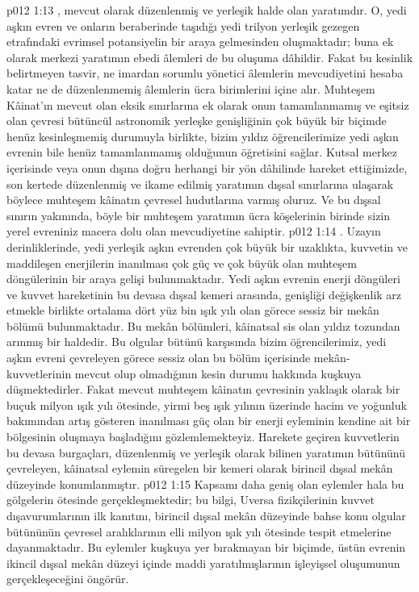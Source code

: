\vs p012 1:13 , mevcut olarak düzenlenmiş ve yerleşik halde olan yaratımdır. O, yedi aşkın evren ve onların beraberinde taşıdığı yedi trilyon yerleşik gezegen etrafındaki evrimsel potansiyelin bir araya gelmesinden oluşmaktadır; buna ek olarak merkezi yaratımın ebedi âlemleri de bu oluşuma dâhildir. Fakat bu kesinlik belirtmeyen tasvir, ne imardan sorumlu yönetici âlemlerin mevcudiyetini hesaba katar ne de düzenlenmemiş âlemlerin ücra birimlerini içine alır. Muhteşem Kâinat’ın mevcut olan eksik sınırlarına ek olarak onun tamamlanmamış ve eşitsiz olan çevresi bütüncül astronomik yerleşke genişliğinin çok büyük bir biçimde henüz kesinleşmemiş durumuyla birlikte, bizim yıldız öğrencilerimize yedi aşkın evrenin bile henüz tamamlanmamış olduğunun öğretisini sağlar. Kutsal merkez içerisinde veya onun dışına doğru herhangi bir yön dâhilinde hareket ettiğimizde, son kertede düzenlenmiş ve ikame edilmiş yaratımın dışsal sınırlarına ulaşarak böylece muhteşem kâinatın çevresel hudutlarına varmış oluruz. Ve bu dışsal sınırın yakınında, böyle bir muhteşem yaratımın ücra köşelerinin birinde sizin yerel evreniniz macera dolu olan mevcudiyetine sahiptir.
\vs p012 1:14 . Uzayın derinliklerinde, yedi yerleşik aşkın evrenden çok büyük bir uzaklıkta, kuvvetin ve maddileşen enerjilerin inanılması çok güç ve çok büyük olan muhteşem döngülerinin bir araya gelişi bulunmaktadır. Yedi aşkın evrenin enerji döngüleri ve kuvvet hareketinin bu devasa dışsal kemeri arasında, genişliği değişkenlik arz etmekle birlikte ortalama dört yüz bin ışık yılı olan görece sessiz bir mekân bölümü bulunmaktadır. Bu mekân bölümleri, kâinatsal sis olan yıldız tozundan arınmış bir haldedir. Bu olgular bütünü karşısında bizim öğrencilerimiz, yedi aşkın evreni çevreleyen görece sessiz olan bu bölüm içerisinde mekân\hyp{}kuvvetlerinin mevcut olup olmadığının kesin durumu hakkında kuşkuya düşmektedirler. Fakat mevcut muhteşem kâinatın çevresinin yaklaşık olarak bir buçuk milyon ışık yılı ötesinde, yirmi beş ışık yılının üzerinde hacim ve yoğunluk bakımından artış gösteren inanılması güç olan bir enerji eyleminin kendine ait bir bölgesinin oluşmaya başladığını gözlemlemekteyiz. Harekete geçiren kuvvetlerin bu devasa burgaçları, düzenlenmiş ve yerleşik olarak bilinen yaratımın bütününü çevreleyen, kâinatsal eylemin süregelen bir kemeri olarak birincil dışsal mekân düzeyinde konumlanmıştır.
\vs p012 1:15 Kapsamı daha geniş olan eylemler hala bu gölgelerin ötesinde gerçekleşmektedir; bu bilgi, Uversa fizikçilerinin kuvvet dışavurumlarının ilk kanıtını, birincil dışsal mekân düzeyinde bahse konu olgular bütününün çevresel aralıklarının elli milyon ışık yılı ötesinde tespit etmelerine dayanmaktadır. Bu eylemler kuşkuya yer bırakmayan bir biçimde, üstün evrenin ikincil dışsal mekân düzeyi içinde maddi yaratılmışlarının işleyişsel oluşumunun gerçekleşeceğini öngörür.
